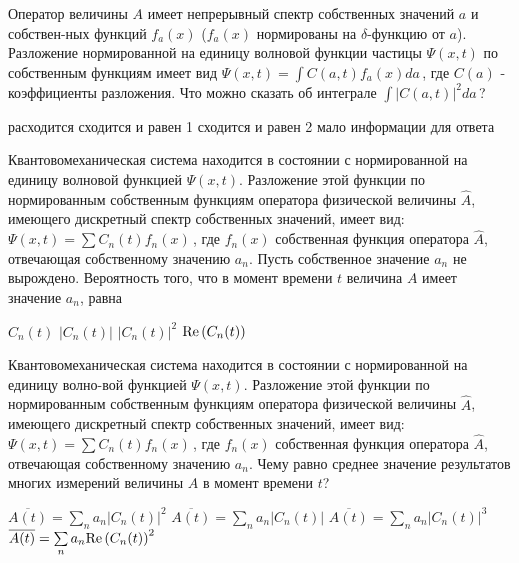 \documentclass[11pt,a4paper]{exam}
\begin{document}
\begin{questions}
\question Оператор величины $A$ имеет непрерывный спектр собственных значений $a$ и собствен-ных функций ${f_a}(x)$ (${f_a}(x)$ нормированы на $\delta $-функцию от $a$). Разложение нормированной на единицу волновой функции частицы $\Psi (x,t)$ по собственным функциям имеет вид $\Psi (x,t) = \int {C(a,t){f_a}(x)da} \,$, где $C(a)$ - коэффициенты разложения. Что можно сказать об интеграле $\int {|C(a,t){|^2}da} \,$?
\begin{choices}
\choice расходится         
\choice сходится и равен 1
\choice сходится и равен 2 
\choice мало информации для ответа
\end{choices}

\question Квантовомеханическая система находится в состоянии с нормированной на единицу волновой функцией $\Psi (x,t)$. Разложение этой функции по нормированным собственным функциям оператора физической величины $\hat A$, имеющего дискретный спектр собственных значений, имеет вид: $\Psi (x,t) = \sum {{C_n}(t)} {f_n}(x)\,$, где ${f_n}(x)$ собственная функция оператора $\hat A$, отвечающая собственному значению ${a_n}$. Пусть собственное значение ${a_n}$ не вырождено. Вероятность того, что в момент времени $t$ величина $A$ имеет значение ${a_n}$, равна
\begin{choices}
\choice ${C_n}(t)$   
\choice $\left| {{C_n}(t)} \right|$ 
\choice ${\left| {{C_n}(t)} \right|^2}$   
\choice ${\mathop{\rm Re}\nolimits} \left( {{C_n}(t)} \right)$
\end{choices}

\question Квантовомеханическая система находится в состоянии с нормированной на единицу волно-вой функцией $\Psi (x,t)$. Разложение этой функции по нормированным собственным функциям оператора физической величины $\hat A$, имеющего дискретный спектр собственных значений, имеет вид: $\Psi (x,t) = \sum {{C_n}(t)} {f_n}(x)\,$, где ${f_n}(x)$ собственная функция оператора $\hat A$, отвечающая собственному значению ${a_n}$. Чему равно среднее значение результатов многих измерений величины $A$ в момент времени $t$?
\begin{choices}
\choice $\overline {A(t)}  = {\sum\limits_n {{a_n}\left| {{C_n}(t)} \right|} ^2}$      
\choice $\overline {A(t)}  = \sum\limits_n {{a_n}\left| {{C_n}(t)} \right|} $
\choice $\overline {A(t)}  = \sum\limits_n {{a_n}{{\left| {{C_n}(t)} \right|}^3}} $    
\choice $\overline {A(t)}  = {\sum\limits_n {{a_n}{\mathop{\rm Re}\nolimits} \left( {{C_n}(t)} \right)} ^2}$
\end{choices}


\end{questions}
\end{document}

